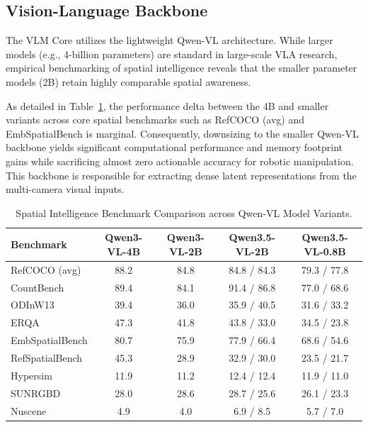 \subsection{Vision-Language Backbone}
\label{sec:vlm_backbone}

The VLM Core utilizes the lightweight Qwen-VL architecture. While larger models (e.g., 4-billion parameters) are standard in large-scale VLA research, empirical benchmarking of spatial intelligence reveals that the smaller parameter models (2B) retain highly comparable spatial awareness. 

As detailed in Table~\ref{tab:spatial_intelligence}, the performance delta between the 4B and smaller variants across core spatial benchmarks such as RefCOCO (avg) and EmbSpatialBench is marginal. Consequently, downsizing to the smaller Qwen-VL backbone yields significant computational performance and memory footprint gains while sacrificing almost zero actionable accuracy for robotic manipulation. This backbone is responsible for extracting dense latent representations from the multi-camera visual inputs.

\begin{table}[H]
    \centering
    \begin{tabular}{lcccc}
        \toprule
        \textbf{Benchmark} & \textbf{Qwen3-VL-4B} & \textbf{Qwen3-VL-2B} & \textbf{Qwen3.5-VL-2B} & \textbf{Qwen3.5-VL-0.8B} \\
        \midrule
        RefCOCO (avg)   & 88.2 & 84.8 & 84.8 / 84.3 & 79.3 / 77.8 \\
        CountBench      & 89.4 & 84.1 & 91.4 / 86.8 & 77.0 / 68.6 \\
        ODInW13         & 39.4 & 36.0 & 35.9 / 40.5 & 31.6 / 33.2 \\
        ERQA            & 47.3 & 41.8 & 43.8 / 33.0 & 34.5 / 23.8 \\
        EmbSpatialBench & 80.7 & 75.9 & 77.9 / 66.4 & 68.6 / 54.6 \\
        RefSpatialBench & 45.3 & 28.9 & 32.9 / 30.0 & 23.5 / 21.7 \\
        Hypersim        & 11.9 & 11.2 & 12.4 / 12.4 & 11.9 / 11.0 \\
        SUNRGBD         & 28.0 & 28.6 & 28.7 / 25.6 & 26.1 / 23.3 \\
        Nuscene         & 4.9  & 4.0  & 6.9 / 8.5   & 5.7 / 7.0   \\
        \bottomrule
    \end{tabular}
    \caption{Spatial Intelligence Benchmark Comparison across Qwen-VL Model Variants.}
    \label{tab:spatial_intelligence}
\end{table}

